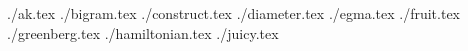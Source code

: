 \documentclass[11pt,letterpaper,oneside]{article}
\newcommand{\importproblem}[2]{{./#2.tex}}
\begin{document}
\importproblem{a}{ak}
\importproblem{b}{bigram}
\importproblem{c}{construct}
\importproblem{d}{diameter}
\importproblem{e}{egma}
\importproblem{f}{fruit}
\importproblem{g}{greenberg}
\importproblem{h}{hamiltonian}
\importproblem{j}{juicy}
\end{document}
